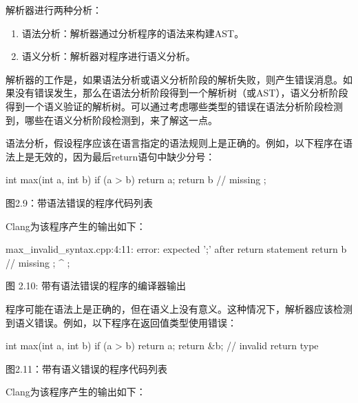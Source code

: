 
解析器进行两种分析：

\begin{enumerate}
\item
语法分析：解析器通过分析程序的语法来构建AST。

\item
语义分析：解析器对程序进行语义分析。
\end{enumerate}

解析器的工作是，如果语法分析或语义分析阶段的解析失败，则产生错误消息。如果没有错误发生，那么在语法分析阶段得到一个解析树（或AST），语义分析阶段得到一个语义验证的解析树。可以通过考虑哪些类型的错误在语法分析阶段检测到，哪些在语义分析阶段检测到，来了解这一点。

语法分析，假设程序应该在语言指定的语法规则上是正确的。例如，以下程序在语法上是无效的，因为最后return语句中缺少分号：

\begin{cpp}
int max(int a, int b) {
  if (a > b)
    return a;
  return b // missing ;
}
\end{cpp}

\begin{center}
图2.9：带语法错误的程序代码列表
\end{center}

Clang为该程序产生的输出如下：

\begin{shell}
max_invalid_syntax.cpp:4:11: error: expected ';' after return statement
  return b // missing ;
          ^
          ;
\end{shell}

\begin{center}
图 2.10: 带有语法错误的程序的编译器输出
\end{center}

程序可能在语法上是正确的，但在语义上没有意义。这种情况下，解析器应该检测到语义错误。例如，以下程序在返回值类型使用错误：

\begin{cpp}
int max(int a, int b) {
  if (a > b)
    return a;
  return &b; // invalid return type
}
\end{cpp}

\begin{center}
图2.11：带有语义错误的程序代码列表
\end{center}

Clang为该程序产生的输出如下：

